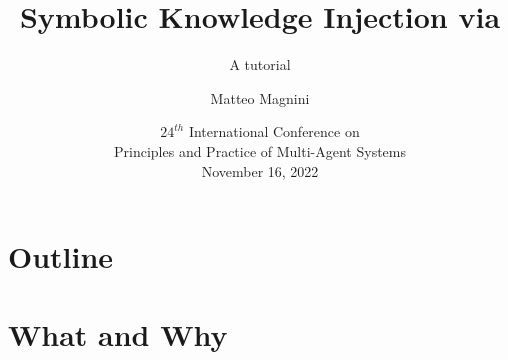 \documentclass[presentation]{beamer}\mode<presentation>{\usetheme{AMSBolognaFC}}
\title[SKI via \psyki{}]{Symbolic Knowledge Injection via \psyki{}}
\subtitle{A tutorial}
\author[\sspeaker{\gcShort} et al.]{
    \speaker{\gcFull} \and Matteo Magnini
    \\
    \gcEmail \and \ttemail{matteo.magnini@unibo.it}
}
\institute[\uniboShort]{
    \disi{} (\disiShort)\\\unibo, Cesena, Italy
}
\date[PRIMA 2022]{
    $24^{th}$ International Conference on 
    \\
    Principles and Practice of Multi-Agent Systems
    \\
    November 16, 2022
}
\begin{document}

\frame{\titlepage}

\section*{Outline}
%
\frame[c]{\tableofcontents[hideallsubsections]}

\section{What and Why}
\end{document}
